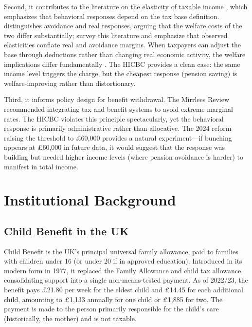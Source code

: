 \documentclass[12pt]{article}
\begin{document}
Second, it contributes to the literature on the elasticity of taxable income \citep{feldstein1999, gruber2002, kopczuk2005, saezslerodrz2012, adam2017}, which emphasizes that behavioral responses depend on the tax base definition. \citet{slemrod1996} distinguishes avoidance and real responses, arguing that the welfare costs of the two differ substantially; \citet{saezslerodrz2012} survey this literature and emphasize that observed elasticities conflate real and avoidance margins. When taxpayers can adjust the base through deductions rather than changing real economic activity, the welfare implications differ fundamentally \citep{chetty2009, chetty2012pp}. The HICBC provides a clean case: the same income level triggers the charge, but the cheapest response (pension saving) is welfare-improving rather than distortionary.

Third, it informs policy design for benefit withdrawal. The Mirrlees Review \citep{mirrlees2011} recommended integrating tax and benefit systems to avoid extreme marginal rates. The HICBC violates this principle spectacularly, yet the behavioral response is primarily administrative rather than allocative. The 2024 reform raising the threshold to \pounds60,000 provides a natural experiment---if bunching appears at \pounds60,000 in future data, it would suggest that the response was building but needed higher income levels (where pension avoidance is harder) to manifest in total income.


\section{Institutional Background}

\subsection{Child Benefit in the UK}

Child Benefit is the UK's principal universal family allowance, paid to families with children under 16 (or under 20 if in approved education). Introduced in its modern form in 1977, it replaced the Family Allowance and child tax allowance, consolidating support into a single non-means-tested payment. As of 2022/23, the benefit pays \pounds21.80 per week for the eldest child and \pounds14.45 for each additional child, amounting to \pounds1,133 annually for one child or \pounds1,885 for two. The payment is made to the person primarily responsible for the child's care (historically, the mother) and is not taxable.
\end{document}
